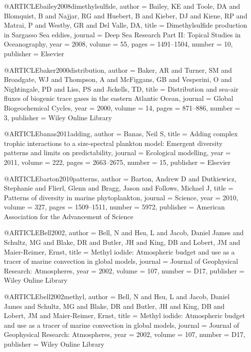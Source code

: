 @ARTICLE{bailey2008dimethylsulfide,
  author = {Bailey, KE and Toole, DA and Blomquist, B and Najjar, RG and Huebert,
	B and Kieber, DJ and Kiene, RP and Matrai, P and Westby, GR and Del
	Valle, DA},
  title = {Dimethylsulfide production in Sargasso Sea eddies},
  journal = {Deep Sea Research Part II: Topical Studies in Oceanography},
  year = {2008},
  volume = {55},
  pages = {1491--1504},
  number = {10},
  publisher = {Elsevier}
}

@ARTICLE{baker2000distribution,
  author = {Baker, AR and Turner, SM and Broadgate, WJ and Thompson, A and McFiggans,
	GB and Vesperini, O and Nightingale, PD and Liss, PS and Jickells,
	TD},
  title = {Distribution and sea-air fluxes of biogenic trace gases in the eastern
	Atlantic Ocean},
  journal = {Global Biogeochemical Cycles},
  year = {2000},
  volume = {14},
  pages = {871--886},
  number = {3},
  publisher = {Wiley Online Library}
}

@ARTICLE{banas2011adding,
  author = {Banas, Neil S},
  title = {Adding complex trophic interactions to a size-spectral plankton model:
	Emergent diversity patterns and limits on predictability},
  journal = {Ecological modelling},
  year = {2011},
  volume = {222},
  pages = {2663--2675},
  number = {15},
  publisher = {Elsevier}
}

@ARTICLE{barton2010patterns,
  author = {Barton, Andrew D and Dutkiewicz, Stephanie and Flierl, Glenn and
	Bragg, Jason and Follows, Michael J},
  title = {Patterns of diversity in marine phytoplankton},
  journal = {Science},
  year = {2010},
  volume = {327},
  pages = {1509--1511},
  number = {5972},
  publisher = {American Association for the Advancement of Science}
}

@ARTICLE{Bell2002,
  author = {Bell, N and Hsu, L and Jacob, Daniel James and Schultz, MG and Blake,
	DR and Butler, JH and King, DB and Lobert, JM and Maier-Reimer, Ernst},
  title = {Methyl iodide: Atmospheric budget and use as a tracer of marine convection
	in global models},
  journal = {Journal of Geophysical Research: Atmospheres},
  year = {2002},
  volume = {107},
  number = {D17},
  publisher = {Wiley Online Library}
}

@ARTICLE{bell2002methyl,
  author = {Bell, N and Hsu, L and Jacob, Daniel James and Schultz, MG and Blake,
	DR and Butler, JH and King, DB and Lobert, JM and Maier-Reimer, Ernst},
  title = {Methyl iodide: Atmospheric budget and use as a tracer of marine convection
	in global models},
  journal = {Journal of Geophysical Research: Atmospheres},
  year = {2002},
  volume = {107},
  number = {D17},
  publisher = {Wiley Online Library}
}

